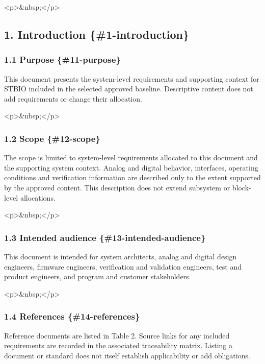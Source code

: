 \documentclass[11pt]{article}
\begin{document}
<p>\&nbsp;</p>

\subsection{1. Introduction \{\#1-introduction\}}


\subsubsection{1.1 Purpose \{\#11-purpose\}}


This document presents the system-level requirements and supporting context for STBIO included in the selected approved baseline. Descriptive content does not add requirements or change their allocation.

<p>\&nbsp;</p>

\subsubsection{1.2 Scope \{\#12-scope\}}


The scope is limited to system-level requirements allocated to this document and the supporting system context. Analog and digital behavior, interfaces, operating conditions and verification information are described only to the extent supported by the approved content. This description does not extend subsystem or block-level allocations.

<p>\&nbsp;</p>

\subsubsection{1.3 Intended audience \{\#13-intended-audience\}}


This document is intended for system architects, analog and digital design engineers, firmware engineers, verification and validation engineers, test and product engineers, and program and customer stakeholders.

<p>\&nbsp;</p>

\subsubsection{1.4 References \{\#14-references\}}


Reference documents are listed in Table 2. Source links for any included requirements are recorded in the associated traceability matrix. Listing a document or standard does not itself establish applicability or add obligations.
\end{document}
